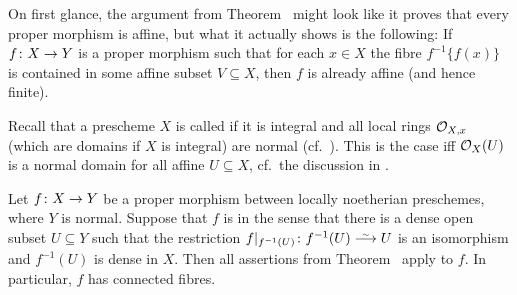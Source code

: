 \documentclass[a4paper,parskip=half,numbers=enddot, DIV=12]{scrreprt}
\begin{document}
\begin{rem}
	On first glance, the argument from Theorem~ might look like it proves that every proper morphism is affine, but what it actually shows is the following: If $f\colon X\morphism Y$ is a proper morphism such that for each $x\in X$ the fibre $f^{-1}\{f(x)\}$ is contained in some affine subset $V\subseteq X$, then $f$ is already affine (and hence finite). 	
\end{rem}
\begin{rem}
	Recall that a prescheme $X$ is called  if it is integral and all local rings $\mathcal{O}_{X,x}$ (which are domains if $X$ is integral) are normal (cf.\ \cite[Definition~2.4.5]{alggeo1}). This is the case iff $\mathcal{O}_X(U)$ is a normal domain for all affine $U\subseteq X$, cf.\ the discussion in \cite[Remark~2.5.1]{alggeo1}.
\end{rem}
\begin{cor}
	Let $f\colon X\morphism Y$ be a proper morphism between locally noetherian preschemes, where $Y$ is normal. Suppose that $f$ is  in the sense that there is a dense open subset $U\subseteq Y$ such that the restriction $f|_{f^{-1}(U)}\colon f^{-1}(U)\isomorphism U$ is an isomorphism and $f^{-1}(U)$ is dense in $X$. Then all assertions from Theorem~ apply to $f$. In particular, $f$ has connected fibres.
\end{cor}
\end{document}
